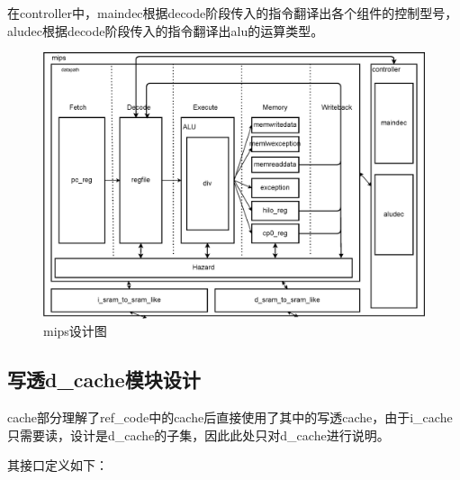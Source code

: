 在controller中，maindec根据decode阶段传入的指令翻译出各个组件的控制型号，aludec根据decode阶段传入的指令翻译出alu的运算类型。

\begin{figure}
    \centering
    \includegraphics[width=\textwidth]{image/mips.eps}
    \caption{mips设计图}
    \label{mips}
\end{figure}


\subsection{写透d\_cache模块设计}

cache部分理解了ref\_code中的cache后直接使用了其中的写透cache，由于i\_cache只需要读，设计是d\_cache的子集，因此此处只对d\_cache进行说明。

其接口定义如下：

